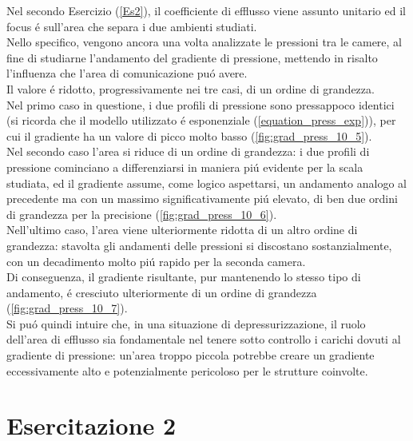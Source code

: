 \documentclass{article}
\begin{document}
        \clearpage

        
        Nel secondo Esercizio (\ref{Es2}), il coefficiente di efflusso viene assunto unitario
        ed il focus é sull'area che separa i due ambienti studiati.\\ 
        Nello specifico, vengono ancora una volta analizzate le pressioni tra le camere, 
        al fine di studiarne l'andamento del gradiente di pressione, 
        mettendo in risalto l'influenza che l'area di comunicazione puó avere.\\ 
        Il valore é ridotto, progressivamente nei tre casi,
        di un ordine di grandezza.\\ \linebreak
        Nel primo caso in questione, i due profili di pressione sono pressappoco identici (si ricorda che il modello utilizzato 
        é esponenziale (\ref{equation_press_exp})), per cui il gradiente ha un valore di picco molto basso (\ref{fig:grad_press_10_5}).\\ 
        Nel secondo caso l'area si riduce di un ordine di grandezza: i due profili
        di pressione cominciano a differenziarsi in maniera piú evidente per la scala studiata,
        ed il gradiente assume, come logico aspettarsi, un andamento analogo al precedente ma con un massimo significativamente
        piú elevato, di ben due ordini di grandezza per la precisione (\ref{fig:grad_press_10_6}).\\ 
        Nell'ultimo caso, l'area viene ulteriormente ridotta di un altro ordine di grandezza:
        stavolta gli andamenti delle pressioni si discostano sostanzialmente, con un decadimento
        molto piú rapido per la seconda camera.\\ 
        Di conseguenza, il gradiente risultante, pur mantenendo lo stesso tipo di 
        andamento, é cresciuto ulteriormente di un ordine di grandezza (\ref{fig:grad_press_10_7}).\\ 
        
    

        Si puó quindi intuire che, in una situazione di depressurizzazione, il ruolo dell'area di efflusso sia fondamentale
        nel tenere sotto controllo i carichi dovuti al gradiente di pressione: un'area troppo piccola
        potrebbe creare un gradiente eccessivamente alto e potenzialmente pericoloso per le
        strutture coinvolte.
        \clearpage
        \section{Esercitazione 2\label{Esercitazione_2}}
        \clearpage
        \printbibliography
\end{document}
